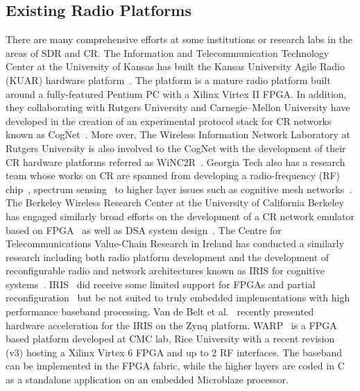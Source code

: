 \subsection{Existing Radio Platforms}
There are many comprehensive efforts at some institutions or research labs in the areas of SDR and CR.
The Information and Telecommunication Technology Center at the University of Kansas has built the Kansas University Agile Radio (KUAR) hardware platform~\cite{Minden2007}.
The platform is a mature radio platform built around a fully-featured Pentium PC with a Xilinx Virtex II FPGA.
In addition, they collaborating with Rutgers University and Carnegie–Mellon University have developed in the creation of an experimental protocol stack for CR networks known as CogNet~\cite{Raychaudhuri2006}.
More over, The Wireless Information Network Laboratory at Rutgers University is also involved to the CogNet with the development of their CR hardware platforms referred as WiNC2R~\cite{Miljanic2007}.
Georgia Tech also has a research team whose works on CR are spanned from developing a radio-frequency (RF) chip~\cite{Mukhopadhyay2005}, spectrum sensing~\cite{Ganesan2005} to higher layer issues such as cognitive mesh networks~\cite{Chowdhury2008}.
The Berkeley Wireless Research Center at the University of California Berkeley has engaged similarly broad efforts on the development of a CR network emulator based on FPGA~\cite{So2008} as well as DSA system design~\cite{Mishra2006}.
The Centre for Telecommunications Value-Chain Research in Ireland has conducted a similarly research including both radio platform development and the development of reconfigurable radio and network architectures known as IRIS for cognitive systems~\cite{Sutton2006}. IRIS~\cite{Sutton2010} did receive some limited support for FPGAs and partial reconfiguration~\cite{fahmy2009,lotze2009} but be not suited to truly embedded implementations with high performance baseband processing. Van de Belt et al.~\cite{Belt2013} recently presented hardware acceleration for the IRIS on the Zynq platform.
WARP~\cite{amiri2007} is a FPGA based platform developed at CMC lab, Rice University with a recent revision (v3) hosting a Xilinx Virtex 6 FPGA and up to 2 RF interfaces. The baseband can be implemented in the FPGA fabric, while the higher layers are coded in C as a standalone application on an embedded Microblaze processor.
